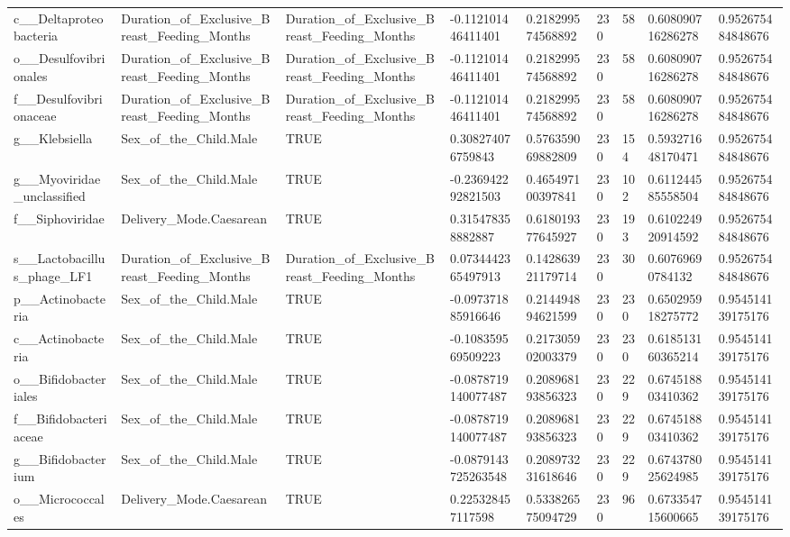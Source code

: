 \begin{longtable}{lllllllll}
c\_\_Deltaproteobacteria & Duration\_of\_Exclusive\_Breast\_Feeding\_Months & Duration\_of\_Exclusive\_Breast\_Feeding\_Months & -0.112101446411401 & 0.218299574568892 & 230 & 58 & 0.608090716286278 & 0.952675484848676 \\
o\_\_Desulfovibrionales & Duration\_of\_Exclusive\_Breast\_Feeding\_Months & Duration\_of\_Exclusive\_Breast\_Feeding\_Months & -0.112101446411401 & 0.218299574568892 & 230 & 58 & 0.608090716286278 & 0.952675484848676 \\
f\_\_Desulfovibrionaceae & Duration\_of\_Exclusive\_Breast\_Feeding\_Months & Duration\_of\_Exclusive\_Breast\_Feeding\_Months & -0.112101446411401 & 0.218299574568892 & 230 & 58 & 0.608090716286278 & 0.952675484848676 \\
g\_\_Klebsiella & Sex\_of\_the\_Child.Male & TRUE & 0.308274076759843 & 0.576359069882809 & 230 & 154 & 0.593271648170471 & 0.952675484848676 \\
g\_\_Myoviridae\_unclassified & Sex\_of\_the\_Child.Male & TRUE & -0.236942292821503 & 0.465497100397841 & 230 & 102 & 0.611244585558504 & 0.952675484848676 \\
f\_\_Siphoviridae & Delivery\_Mode.Caesarean & TRUE & 0.315478358882887 & 0.618019377645927 & 230 & 193 & 0.610224920914592 & 0.952675484848676 \\
s\_\_Lactobacillus\_phage\_LF1 & Duration\_of\_Exclusive\_Breast\_Feeding\_Months & Duration\_of\_Exclusive\_Breast\_Feeding\_Months & 0.0734442365497913 & 0.142863921179714 & 230 & 30 & 0.60769690784132 & 0.952675484848676 \\
p\_\_Actinobacteria & Sex\_of\_the\_Child.Male & TRUE & -0.097371885916646 & 0.214494894621599 & 230 & 230 & 0.650295918275772 & 0.954514139175176 \\
c\_\_Actinobacteria & Sex\_of\_the\_Child.Male & TRUE & -0.108359569509223 & 0.217305902003379 & 230 & 230 & 0.618513160365214 & 0.954514139175176 \\
o\_\_Bifidobacteriales & Sex\_of\_the\_Child.Male & TRUE & -0.0878719140077487 & 0.208968193856323 & 230 & 229 & 0.674518803410362 & 0.954514139175176 \\
f\_\_Bifidobacteriaceae & Sex\_of\_the\_Child.Male & TRUE & -0.0878719140077487 & 0.208968193856323 & 230 & 229 & 0.674518803410362 & 0.954514139175176 \\
g\_\_Bifidobacterium & Sex\_of\_the\_Child.Male & TRUE & -0.0879143725263548 & 0.208973231618646 & 230 & 229 & 0.674378025624985 & 0.954514139175176 \\
o\_\_Micrococcales & Delivery\_Mode.Caesarean & TRUE & 0.225328457117598 & 0.533826575094729 & 230 & 96 & 0.673354715600665 & 0.954514139175176 \\

\end{longtable}
